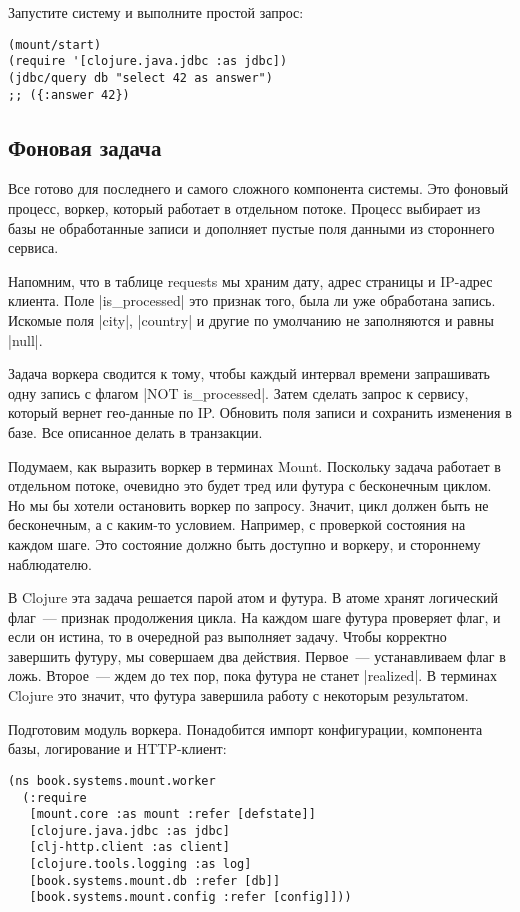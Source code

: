 Запустите систему и выполните простой запрос:

\begin{verbatim}
(mount/start)
(require '[clojure.java.jdbc :as jdbc])
(jdbc/query db "select 42 as answer")
;; ({:answer 42})
\end{verbatim}

\subsection{Фоновая задача}

Все готово для последнего и самого сложного компонента системы. Это фоновый
процесс, воркер, который работает в отдельном потоке. Процесс выбирает из базы
не обработанные записи и дополняет пустые поля данными из стороннего сервиса.

Напомним, что в таблице requests мы храним дату, адрес страницы и IP-адрес
клиента. Поле \spverb|is_processed| это признак того, была ли уже обработана
запись. Искомые поля \spverb|city|, \spverb|country| и другие по умолчанию не заполняются и
равны \spverb|null|.

Задача воркера сводится к тому, чтобы каждый интервал времени запрашивать одну
запись с флагом \spverb|NOT is_processed|. Затем сделать запрос к сервису, который
вернет гео-данные по IP. Обновить поля записи и сохранить изменения в базе. Все
описанное делать в транзакции.

Подумаем, как выразить воркер в терминах Mount. Поскольку задача работает в
отдельном потоке, очевидно это будет тред или футура с бесконечным циклом. Но мы
бы хотели остановить воркер по запросу. Значит, цикл должен быть не бесконечным,
а с каким-то условием. Например, с проверкой состояния на каждом шаге. Это
состояние должно быть доступно и воркеру, и стороннему наблюдателю.

В Clojure эта задача решается парой атом и футура. В атоме хранят логический
флаг~--- признак продолжения цикла. На каждом шаге футура проверяет флаг, и если
он истина, то в очередной раз выполняет задачу. Чтобы корректно завершить
футуру, мы совершаем два действия. Первое~--- устанавливаем флаг в ложь. Второе~---
ждем до тех пор, пока футура не станет \spverb|realized|. В терминах Clojure это
значит, что футура завершила работу с некоторым результатом.

Подготовим модуль воркера. Понадобится импорт конфигурации, компонента базы,
логирование и HTTP-клиент:

\begin{verbatim}
(ns book.systems.mount.worker
  (:require
   [mount.core :as mount :refer [defstate]]
   [clojure.java.jdbc :as jdbc]
   [clj-http.client :as client]
   [clojure.tools.logging :as log]
   [book.systems.mount.db :refer [db]]
   [book.systems.mount.config :refer [config]]))
\end{verbatim}


